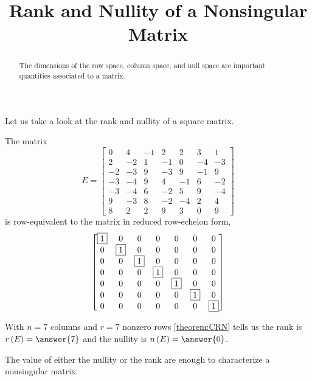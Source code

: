 \documentclass{ximera}
\title{Rank and Nullity of a Nonsingular Matrix}
\begin{document}
\begin{abstract}
  The dimensions of the row space, column space, and null space are
  important quantities associated to a matrix.
\end{abstract}
\maketitle

Let us take a look at the rank and nullity of a square matrix.

\begin{example}
  The matrix
  \[
    E=\begin{bmatrix}
      0 & 4 & -1 & 2 & 2 & 3 & 1\\
      2 & -2 & 1 & -1 & 0 & -4 & -3\\
      -2 & -3 & 9 & -3 & 9 & -1 & 9\\
      -3 & -4 & 9 & 4 & -1 & 6 & -2\\
      -3 & -4 & 6 & -2 & 5 & 9 & -4\\
      9 & -3 & 8 & -2 & -4 & 2 & 4\\
      8 & 2 & 2 & 9 & 3 & 0 & 9
    \end{bmatrix}
  \]
  is row-equivalent to the matrix in reduced row-echelon form,
  \[
    \begin{bmatrix}
      \fbox{1} & 0 & 0 & 0 & 0 & 0 & 0\\
      0 & \fbox{1} & 0 & 0 & 0 & 0 & 0\\
      0 & 0 & \fbox{1} & 0 & 0 & 0 & 0\\
      0 & 0 & 0 & \fbox{1} & 0 & 0 & 0\\
      0 & 0 & 0 & 0 & \fbox{1} & 0 & 0\\
      0 & 0 & 0 & 0 & 0 & \fbox{1} & 0\\
      0 & 0 & 0 & 0 & 0 & 0 & \fbox{1}
    \end{bmatrix}
  \]
  
  With $n=7$ columns and $r=7$ nonzero rows \ref{theorem:CRN} tells us
  the rank is $\rank{E}=\answer{7}$ and the nullity is $\nullity{E}=\answer{0}$.
\end{example}

The value of either the nullity or the rank are enough to characterize a nonsingular matrix.
\end{document}

